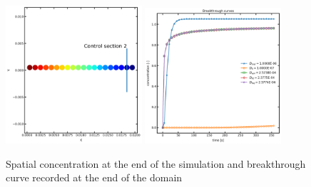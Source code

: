 \documentclass{article}
\begin{document}
\begin{figure}[htbp!]
    \centering
    \includegraphics[width=0.45\textwidth]{images/fromOpenPNM/validationCS2.png}
    \hspace{0.05\textwidth}
    \includegraphics[width=0.45\textwidth]{images/fromOpenPNM/btcCS2.png}
    \caption{Spatial concentration at the end of the simulation and breakthrough curve recorded at the end of the domain}
    \label{fig:Validation2}
\end{figure}

\FloatBarrier  %
\end{document}
